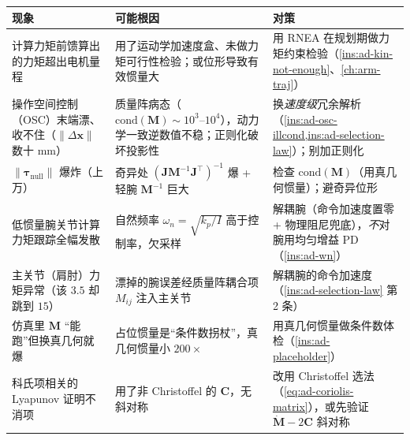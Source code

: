 \begin{center}
\begin{tabular}{p{} p{} p{}}
\toprule
现象 & 可能根因 & 对策 \\
\midrule
计算力矩前馈算出的力矩超出电机量程 & 用了运动学加速度盒、未做力矩可行性检验；或位形导致有效惯量大 & 用 RNEA 在规划期做力矩约束检验（\cref{ins:ad-kin-not-enough}、\cref{ch:arm-traj}）\\
操作空间控制（OSC）末端漂、收不住（$\|\Delta\mathbf{x}\|$ 数十 mm）& 质量阵病态（$\mathrm{cond}(\mathbf{M})\sim10^3$--$10^4$），动力学一致逆数值不稳；正则化破坏投影性 & 换\emph{速度级}冗余解析（\cref{ins:ad-osc-illcond,ins:ad-selection-law}）；别加正则化 \\
$\|\boldsymbol{\tau}_{\text{null}}\|$ 爆炸（上万）& 奇异处 $(\mathbf{J}\mathbf{M}^{-1}\mathbf{J}^\top)^{-1}$ 爆 + 轻腕 $\mathbf{M}^{-1}$ 巨大 & 检查 $\mathrm{cond}(\mathbf{M})$（用真几何惯量）；避奇异位形 \\
低惯量腕关节计算力矩跟踪全幅发散 & 自然频率 $\omega_n=\sqrt{k_p/I}$ 高于控制率，欠采样 & 解耦腕（命令加速度置零 + 物理阻尼兜底），\emph{不}对腕用均匀增益 PD（\cref{ins:ad-wn}）\\
主关节（肩肘）力矩异常（该 $3.5$ 却跳到 $15$）& 漂掉的腕误差经质量阵耦合项 $M_{ij}$ 注入主关节 & 解耦腕的命令加速度（\cref{ins:ad-selection-law} 第 2 条）\\
仿真里 $\mathbf{M}$ “能跑”但换真几何就爆 & 占位惯量是“条件数拐杖”，真几何惯量小 $200\times$ & 用真几何惯量做条件数体检（\cref{ins:ad-placeholder}）\\
科氏项相关的 Lyapunov 证明不消项 & 用了非 Christoffel 的 $\mathbf{C}$，无斜对称 & 改用 Christoffel 选法（\cref{eq:ad-coriolis-matrix}），或先验证 $\dot{\mathbf{M}}-2\mathbf{C}$ 斜对称 \\
\bottomrule
\end{tabular}
\end{center}
